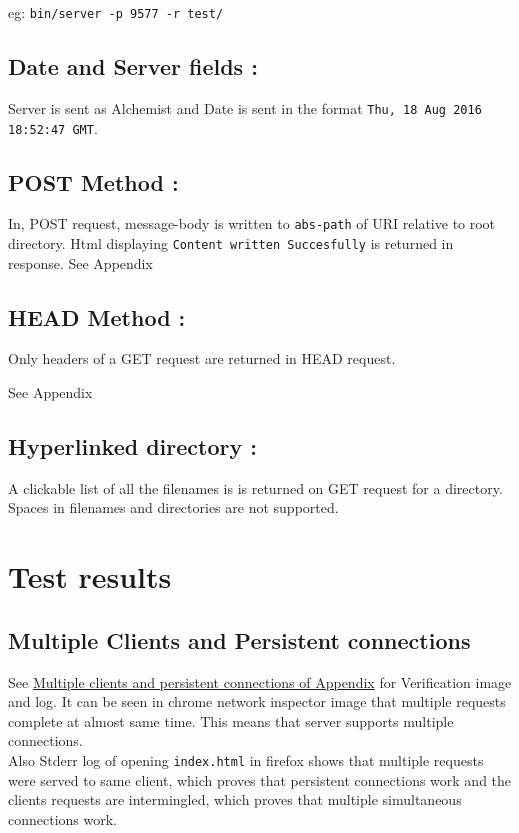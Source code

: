 \documentclass[11pt]{article}
\begin{document}
\noindent eg: \texttt{bin/server -p 9577 -r test/}
\subsection{Date and Server fields :}
\label{sec:orgheadline5}
Server is sent as Alchemist and Date is sent in the format \texttt{Thu, 18 Aug 2016 18:52:47 GMT}.
\subsection{POST Method :}
\label{sec:orgheadline6}
In, POST request, message-body is written to \texttt{abs-path} of URI relative to root directory.
Html displaying \texttt{Content written Succesfully} is returned in response.
\noindent See Appendix
\subsection{HEAD Method :}
\label{sec:orgheadline7}
Only headers of a GET request are returned in HEAD request.

\noindent See Appendix
\subsection{Hyperlinked directory :}
\label{sec:orgheadline8}
A clickable list of all the filenames is is returned on GET request for a directory. Spaces in filenames and directories are not supported.

\newpage
\section{Test results}
\label{sec:orgheadline26}
\subsection{Multiple Clients and Persistent connections}
\label{sec:orgheadline11}
See \hyperref[sec:orgheadline10]{Multiple clients and persistent connections of Appendix} for Verification image and log.
It can be seen in chrome network inspector image that multiple requests complete at almost same time. This means that server supports multiple connections.  \\
Also Stderr log of opening \texttt{index.html} in firefox shows that multiple requests were served to same client, which proves that persistent 
connections work and the clients requests are intermingled, which proves that multiple simultaneous connections work.
\end{document}
